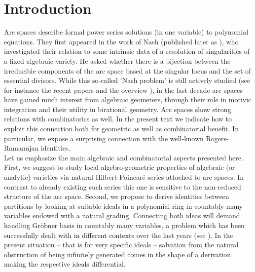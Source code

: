 \section{Introduction}\label{sec:section_1}

Arc spaces describe formal power series solutions (in one variable) to 
polynomial equations. They first appeared in the work of Nash (published later as \cite{nash}), who investigated their relation to some intrinsic data of a resolution of singularities of a fixed algebraic variety. He asked whether there is a bijection between the irreducible components of the arc space based at the singular locus and the set of essential divisors. While this so-called `Nash problem' is still actively studied (see for instance the recent papers \cite{monique_ana,plenat_spivakovsky,pe,fernandez} and the overview \cite{ishii_intro}), in the last decade arc spaces have gained much interest from algebraic geometers, through their role in motivic integration and their utility in birational geometry.
Arc spaces show strong relations with combinatorics as well. In the present text we
indicate how to exploit this connection both for geometric as well as
combinatorial benefit. In particular, we expose a surprising connection with the well-known
Rogers-Ramanujan identities.\\

Let us emphasize the main algebraic and combinatorial aspects
presented here. First, we suggest to study local algebro-geometric
properties of algebraic (or analytic) varieties via natural
Hilbert-Poincar\'{e} series attached to arc spaces. In contrast to
already existing such series this one is sensitive to the
non-reduced structure of the arc space. Second, we propose
to derive identities between partitions by looking at suitable ideals
in a polynomial ring in countably many variables endowed with a
natural grading. Connecting both ideas will demand handling
Gr\"{o}bner basis in countably many variables, a problem which has
been successfully dealt with in different contexts over the last
years (see \cite{hillar_sullivant,draisma}). In the present situation -- that is for very specific ideals --
salvation from the natural obstruction of being infinitely generated
comes in the shape of a derivation making the respective ideals
differential.\\

